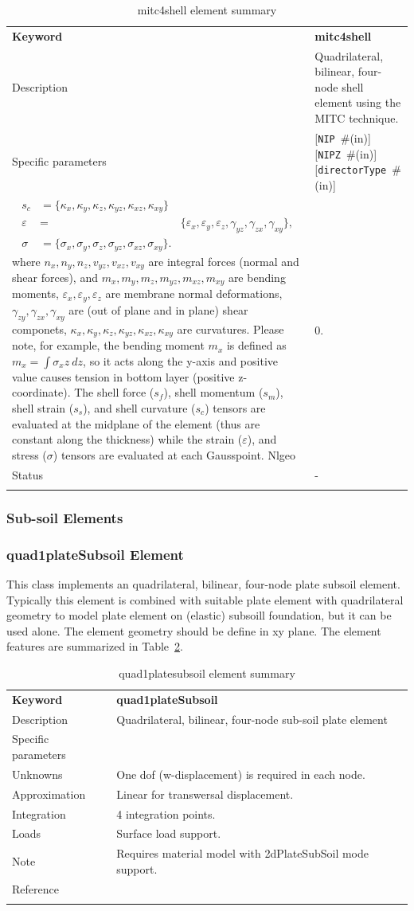 \documentclass[a4paper]{article}
\newcommand{\param}[1]{\texttt{#1}} %
\newcommand{\optional}[1]{[#1]} %
\newcommand{\field}[2]{\param{#1}~\#{\tiny(#2)}} %
\newcommand{\optField}[2]{\optional{\field{#1}{#2}}}
\newcommand{\templabel}{}%
\newcommand{\tempcaption}{}%
\newcounter{nelpar}
\newenvironment{elementsummary}[5]{%
  \gdef\tempcaption{#4}%
  \gdef\templabel{#5}%
  \setcounter{nelpar}{0}%
  \begin{center} %
    \begin{table}[!htb] %
      \begin{tabular}{|l|p{9cm}|}\hline %
        {\bf Keyword} & \bf{#1}\\ %
        {Description} & {#2}\\ %
        {Specific parameters} & {#3}\\ \hline %
}{
  \\ \hline %
      \end{tabular}%
      \caption{\tempcaption}%
      \label{\templabel}%
    \end{table}%
  \end{center}%
}
\newcommand{\elementParam}[1]{%
  \ifthenelse{\value{nelpar}>0} %
             {&{#1}}%
             {\setcounter{nelpar}{1}Parameters&{#1}}%
             \\%
}
\newcommand{\elementDescription}[2]{{#1} & {#2}\\}
\begin{document}
\begin{elementsummary}{mitc4shell}{Quadrilateral, bilinear, four-node shell element using the MITC technique.}{\optField{NIP}{in} \optField{NIPZ}{in} \optField{directorType}{in}}{mitc4shell element summary}{mitc4shellsummary}
{\begin{align*}
s_c &= \{\kappa_x, \kappa_y, \kappa_z, \kappa_{yz}, \kappa_{xz}, \kappa_{xy}\}\\
\varepsilon&=&\{\varepsilon_x, \varepsilon_y, \varepsilon_z, \gamma_{yz}, \gamma_{zx}, \gamma_{xy}\},\\
\sigma &= \{\sigma_x, \sigma_y, \sigma_z, \sigma_{yz}, \sigma_{xz}, \sigma_{xy}\}.
\end{align*}
where $n_x, n_y, n_z, v_{yz}, v_{xz}, v_{xy}$ are integral forces (normal and shear forces), and $m_x, m_y, m_z, m_{yz}, m_{xz}, m_{xy}$ are bending moments, $\varepsilon_x, \varepsilon_y, \varepsilon_z$ are membrane normal deformations, $\gamma_{zy}, \gamma_{zx}, \gamma_{xy}$ are (out of plane and in plane) shear componets, $\kappa_x, \kappa_y, \kappa_z, \kappa_{yz}, \kappa_{xz}, \kappa_{xy}$ are curvatures.  
Please note, for example, the bending moment $m_x$ is defined as $m_x=\int \sigma_x z\ dz$, so it acts along the y-axis and positive value causes tension in bottom layer (positive z-coordinate).
The shell force ($s_f$), shell momentum ($s_m$), shell strain ($s_s$), and shell curvature ($s_c$) tensors are evaluated at the midplane of the element (thus are constant along the thickness) while the strain ($\varepsilon$), and stress ($\sigma$) tensors are evaluated at each Gausspoint.
}
\elementDescription{Nlgeo}{0.}
\elementDescription{Status}{-}
\end{elementsummary}


\subsubsection{Sub-soil Elements}
\subsubsection{quad1plateSubsoil Element} \label{quad1platesubsoil}
This class implements an quadrilateral, bilinear, four-node plate subsoil element.
Typically this element is combined with suitable plate element with quadrilateral geometry to model plate element on 
(elastic) subsoill foundation, but it can be used alone. The element geometry should be define in xy plane.
The element features are summarized in Table~\ref{quad1platesubsoilsummary}.

\begin{elementsummary}{quad1plateSubsoil}{Quadrilateral, bilinear, four-node sub-soil plate element}{}{quad1platesubsoil element summary}{quad1platesubsoilsummary}
\elementDescription{Unknowns}{One dof (w-displacement) is required in each node.}
\elementDescription{Approximation}{Linear for transwersal displacement.}
\elementDescription{Integration}{4 integration points.}
\elementDescription{Loads}{Surface load support.}
\elementDescription{Note}{Requires material model with 2dPlateSubSoil mode support.}
\elementDescription{Reference}{\cite{BittnarSejnoha1996}}
\end{elementsummary}
\end{document}
